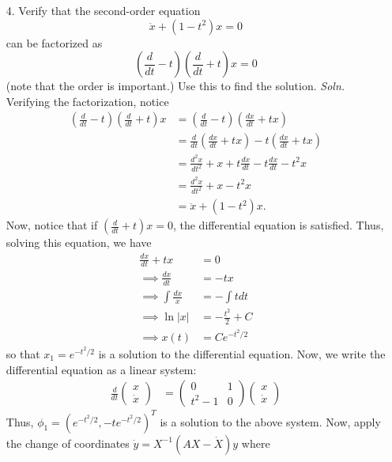 \documentclass{article}
\begin{document}
\begin{itemize}
    \item[4.] Verify that the second-order equation
    \[\ddot{x} + (1 - t^2)x = 0\]
    can be factorized as 
    \[\left(\frac{d}{dt} - t\right)\left(\frac{d}{dt} + t\right)x = 0\]
    (note that the order is important.) Use this to find the solution.
    \newline\newline
    \textit{Soln.} Verifying the factorization, notice
    \begin{align*}
        \left(\frac{d}{dt} - t\right)\left(\frac{d}{dt} + t\right)x &= \left(\frac{d}{dt} - t\right)\left(\frac{dx}{dt} + tx\right)\\
        &= \frac{d}{dt}\left(\frac{dx}{dt} + tx\right) - t\left(\frac{dx}{dt} + tx\right)\\
        &= \frac{d^2x}{dt^2} + x + t\frac{dx}{dt} - t\frac{dx}{dt} - t^2x\\
        &= \frac{d^2x}{dt^2} + x - t^2x\\
        &= \ddot{x} + (1 - t^2)x.
    \end{align*}
    Now, notice that if $\left(\frac{d}{dt} + t\right)x = 0$, the differential equation is satisfied. Thus, solving this equation, we have
    \begin{align*}
        \frac{dx}{dt} + tx &= 0\\
        \implies \frac{dx}{dt} &= -tx\\
        \implies \int \frac{dx}{x} &= -\int t dt\\
        \implies \ln|x| &= -\frac{t^2}{2} + C\\
        \implies x(t) &= Ce^{-t^2/2}
    \end{align*}
    so that $x_1 = e^{-t^2/2}$ is a solution to the differential equation. Now, we write the differential equation as a linear system:
    \begin{align*}
        \frac{d}{dt}\begin{pmatrix}
            x\\
            \dot{x}
        \end{pmatrix} &= \begin{pmatrix}
            0 & 1\\
            t^2 - 1 & 0
        \end{pmatrix}\begin{pmatrix}
            x\\
            \dot{x}
        \end{pmatrix}
    \end{align*}
    Thus, $\phi_1 = (e^{-t^2/2}, -te^{-t^2/2})^T$ is a solution to the above system. Now, apply the change of coordinates $\dot{y} = X^{-1}(AX - \dot{X})y$ where

\end{itemize}
\end{document}
